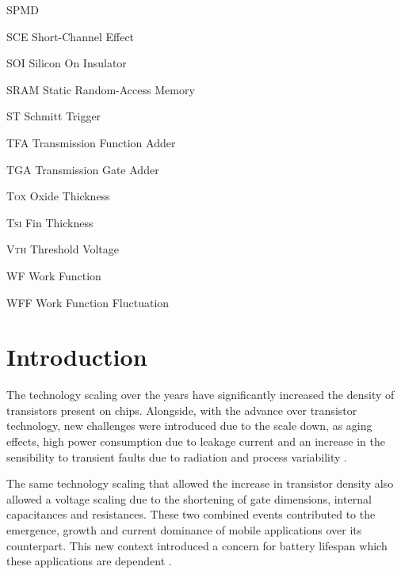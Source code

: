 \documentclass[ecp,tc, english]{iiufrgs}
\begin{document}
\begin{listofabbrv}{SPMD}
        \item[SCE] Short-Channel Effect
        \item[SOI] Silicon On Insulator
        \item[SRAM] Static Random-Access Memory
        \item[ST] Schmitt Trigger
        \item[TFA] Transmission Function Adder
        \item[TGA] Transmission Gate Adder
        \item[T\textsc{ox}] Oxide Thickness
        \item[T\textsc{si}] Fin Thickness
        \item[V\textsc{th}] Threshold Voltage
        \item[WF] Work Function
        \item[WFF] Work Function Fluctuation
\end{listofabbrv}


\listoffigures

\listoftables

\tableofcontents


\chapter{Introduction}
The technology scaling over the years have significantly increased the density of transistors present on chips. Alongside, with the advance over transistor technology, new challenges were introduced due to the scale down, as aging effects, high power consumption due to leakage current and an increase in the sensibility to transient faults due to radiation and process variability \cite{abbas:15}.

The same technology scaling that allowed the increase in transistor density also allowed a voltage scaling due to the shortening of gate dimensions, internal capacitances and resistances. These two combined events contributed to the emergence, growth and current dominance of mobile applications over its counterpart. This new context introduced a concern for battery lifespan which these applications are dependent \cite{islam:10}. 
\end{document}
